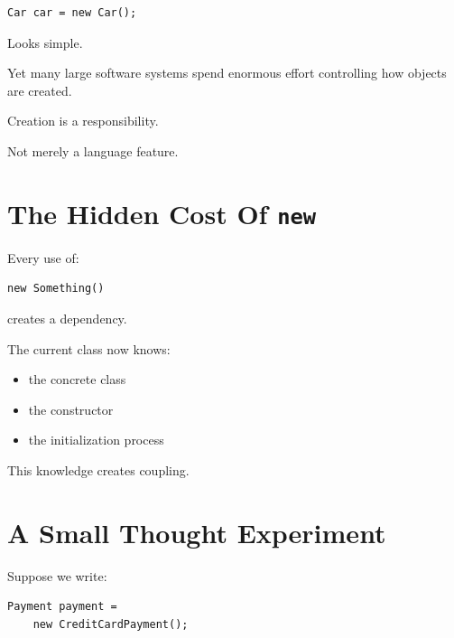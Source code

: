 \documentclass[11pt,a4paper]{book}
\begin{document}
\begin{verbatim}
Car car = new Car();
\end{verbatim}

Looks simple.

Yet many large software systems spend enormous effort
controlling how objects are created.

\begin{rosettarule}

Creation is a responsibility.

Not merely a language feature.

\end{rosettarule}


\section{The Hidden Cost Of \texttt{new}}

\begin{idea}

Every use of:

\begin{verbatim}
new Something()
\end{verbatim}

creates a dependency.

\end{idea}

The current class now knows:

\begin{itemize}
\item the concrete class
\item the constructor
\item the initialization process
\end{itemize}

This knowledge creates coupling.


\section{A Small Thought Experiment}

Suppose we write:

\begin{verbatim}
Payment payment =
    new CreditCardPayment();
\end{verbatim}
\end{document}
